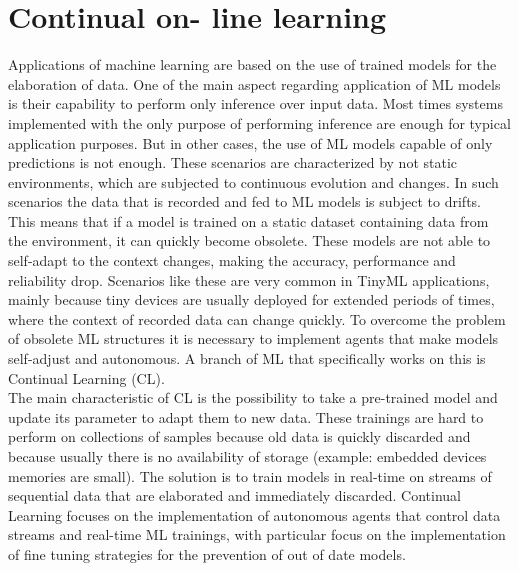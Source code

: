 \documentclass[12pt]{report}
\begin{document}
\section{Continual on- line learning}
Applications of machine learning are based on the use of trained models for the elaboration of data. One of the main aspect regarding application of ML models is their capability to perform only inference over input data. Most times systems implemented with the only purpose of performing inference are enough for typical application purposes. But in other cases, the use of ML models capable of only predictions is not enough. These scenarios are characterized by not static environments, which are subjected to continuous evolution and changes. In such scenarios the data that is recorded and fed to ML models is subject to drifts. This means that if a model is trained on a static dataset containing data from the environment, it can quickly become obsolete. These models are not able to self-adapt to the context changes, making the accuracy, performance and reliability drop. Scenarios like these are very common in TinyML applications, mainly because tiny devices are usually deployed for extended periods of times, where the context of recorded data can change quickly. To overcome the problem of obsolete ML structures it is necessary to implement agents that make models self-adjust and autonomous. A branch of ML that specifically works on this is Continual Learning (CL). \\
The main characteristic of CL is the possibility to take a pre-trained model and update its parameter to adapt them to new data. These trainings are hard to perform on collections of samples because old data is quickly discarded and because usually there is no availability of storage (example: embedded devices memories are small). The solution is to train models in real-time on streams of sequential data that are elaborated and immediately discarded. Continual Learning focuses on the implementation of autonomous agents that control data streams and real-time ML trainings, with particular focus on the implementation of fine tuning strategies for the prevention of out of date models.\\
\end{document}
